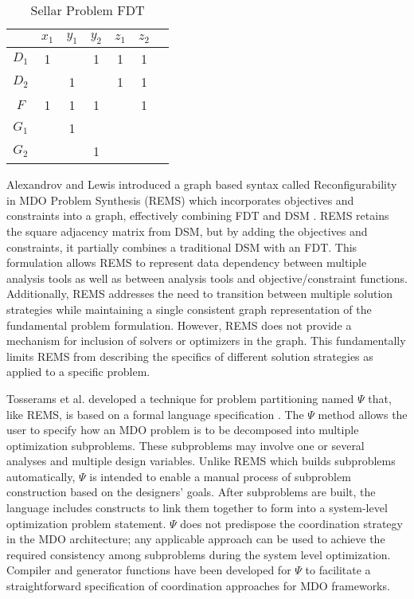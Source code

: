 \begin{table}[htb!]
  \centering
        \caption{Sellar Problem FDT}
        \begin{tabular}{|c|c|c|c|c|c|c|}
            \hline
                   & $x_1$ & $y_1$ & $y_2$ & $z_1$ & $z_2$ \\ \hline
            $D_1$  & 1     &       & 1     & 1     & 1     \\ \hline
            $D_2$  &       & 1     &       & 1     & 1     \\ \hline
            $F$    & 1     & 1     & 1     &       & 1     \\ \hline
            $G_1$  &       & 1     &       &       &       \\ \hline
            $G_2$  &       &       & 1     &       &       \\
            \hline
        \end{tabular}
 \label{t:FDT_simple}
\end{table}%

    Alexandrov and Lewis introduced a graph based syntax called Reconfigurability in
    MDO Problem Synthesis (REMS) which incorporates objectives and constraints
    into a graph, effectively combining FDT and DSM \cite{alexandrov2004}. REMS retains the square adjacency
    matrix from DSM, but by adding the objectives and constraints, it partially
    combines a traditional DSM with an FDT. This formulation allows REMS to represent data
    dependency between multiple analysis tools as well as between analysis tools and
    objective/constraint functions. Additionally, REMS addresses the need to
    transition between multiple solution strategies while maintaining a single consistent
    graph representation of the fundamental problem formulation. However, REMS does not provide
    a mechanism for inclusion of solvers or optimizers in the graph. This fundamentally limits REMS
    from describing the specifics of different solution strategies as applied to a specific problem.

Tosserams et al. developed a technique for problem partitioning named $\Psi$ that, like REMS, is based on a formal language specification \cite{Tosserams2010}.  The $\Psi$ method allows the user to specify how an MDO problem is to be decomposed into multiple optimization subproblems.  These subproblems may involve one or several analyses and multiple design variables.  Unlike REMS which builds subproblems automatically, $\Psi$ is intended to enable a manual process of subproblem construction based on the designers’ goals.  After subproblems are built, the language includes constructs to link them together to form into a system-level optimization problem statement.  $\Psi$ does not predispose the coordination strategy in the MDO architecture; any applicable approach can be used to achieve the required consistency among subproblems during the system level optimization.   Compiler and generator functions have been developed for $\Psi$ to facilitate a straightforward specification of coordination approaches for MDO frameworks.

